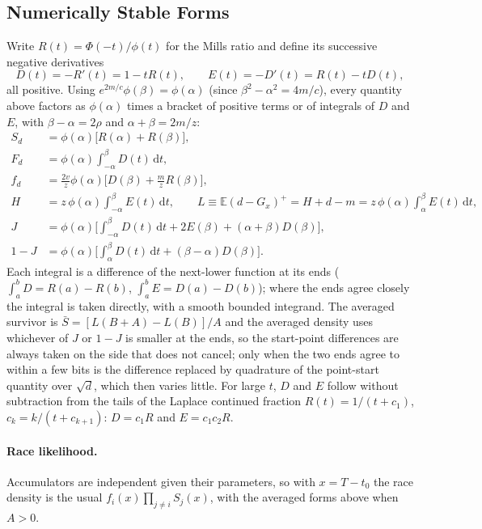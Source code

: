 \documentclass[12pt]{article}
\newcommand{\dd}{\,\mathrm{d}}
\newcommand{\PhiN}{\Phi}
\newcommand{\phiN}{\phi}
\begin{document}
\subsection{Numerically Stable Forms}
Write $R(t)=\PhiN(-t)/\phiN(t)$ for the Mills ratio and define its successive negative derivatives
\begin{equation}
  D(t)=-R'(t)=1-tR(t),\qquad E(t)=-D'(t)=R(t)-tD(t),
  \label{eq:igs-mills}
\end{equation}
all positive. Using $e^{2m/c}\phiN(\beta)=\phiN(\alpha)$ (since $\beta^2-\alpha^2=4m/c$), every quantity above factors as $\phiN(\alpha)$ times a bracket of positive terms or of integrals of $D$ and $E$, with $\beta-\alpha=2\rho$ and $\alpha+\beta=2m/z$:
\begin{align}
  S_d&=\phiN(\alpha)\big[R(\alpha)+R(\beta)\big],\\
  F_d&=\phiN(\alpha)\int_{-\alpha}^{\beta}D(t)\dd t,\\
  f_d&=\frac{2v}{z}\phiN(\alpha)\Big[D(\beta)+\frac mzR(\beta)\Big],\\
  H&=z\,\phiN(\alpha)\int_{-\alpha}^{\beta}E(t)\dd t,\qquad
  L\equiv\mathbb E(d-G_x)^+=H+d-m=z\,\phiN(\alpha)\int_{\alpha}^{\beta}E(t)\dd t,\\
  J&=\phiN(\alpha)\Big[\int_{-\alpha}^{\beta}D(t)\dd t+2E(\beta)+(\alpha+\beta)D(\beta)\Big],\\
  1-J&=\phiN(\alpha)\Big[\int_{\alpha}^{\beta}D(t)\dd t+(\beta-\alpha)D(\beta)\Big].
\end{align}
Each integral is a difference of the next-lower function at its ends ($\int_a^bD=R(a)-R(b)$, $\int_a^bE=D(a)-D(b)$); where the ends agree closely the integral is taken directly, with a smooth bounded integrand. The averaged survivor is $\bar S=[L(B+A)-L(B)]/A$ and the averaged density uses whichever of $J$ or $1-J$ is smaller at the ends, so the start-point differences are always taken on the side that does not cancel; only when the two ends agree to within a few bits is the difference replaced by quadrature of the point-start quantity over $\sqrt d$, which then varies little. For large $t$, $D$ and $E$ follow without subtraction from the tails of the Laplace continued fraction $R(t)=1/(t+c_1)$, $c_k=k/(t+c_{k+1})$: $D=c_1R$ and $E=c_1c_2R$.

\paragraph{Race likelihood.}
Accumulators are independent given their parameters, so with $x=T-t_0$ the race density is the usual $f_i(x)\prod_{j\ne i}S_j(x)$, with the averaged forms above when $A>0$.
\end{document}
